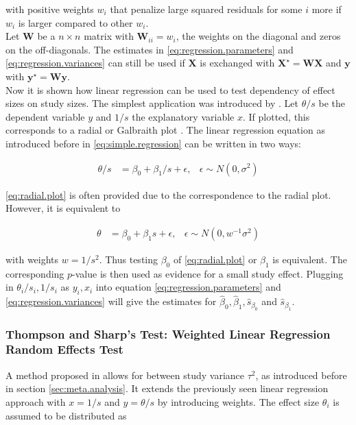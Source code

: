 with positive weights $w_i$ that penalize large squared residuals for some $i$ more if $w_i$ is larger compared to other $w_i$. \\
Let $\mathbf{W}$ be a $n \times n$ matrix with $\mathbf{W}_{ii} = w_i$, the weights on the diagonal and zeros on the off-diagonals. The estimates in \ref{eq:regression.parameters} and \ref{eq:regression.variances} can still be used if $\mathbf{X}$ is exchanged with $\mathbf{X}^\star =  \mathbf{W} \mathbf{X}$ and $\mathbf{y}$ with $\mathbf{y}^\star = \mathbf{W} \mathbf{y}$. \label{weighted.regression} \\
Now it is shown how linear regression can be used to test dependency of effect sizes on study sizes. The simplest application was introduced by \citet{Egger}.
Let $\theta/s$ be the dependent variable $y$ and $1/s$ the explanatory variable $x$. If plotted, this corresponds to a radial or Galbraith plot \citet{galbraith}. The linear regression equation as introduced before in \ref{eq:simple.regression} can be written in two ways:

\begin{align}
\theta/s &= \beta_0 + \beta_1/s + \epsilon, & \epsilon \sim N(0, \sigma^2) \label{eq:radial.plot} 
\end{align}

\ref{eq:radial.plot} is often provided due to the correspondence to the radial plot. However, it is equivalent to

\begin{align}
\theta &= \beta_0 + \beta_1 s + \epsilon, & \epsilon \sim N(0, w^{-1}\sigma^2) \label{eq:egger.plot}
\end{align}

with weights $w = 1/s^2$. Thus testing $\beta_0$ of \ref{eq:radial.plot} or $\beta_1$ is equivalent. The corresponding $p$-value is then used as evidence for a small study effect. Plugging in  $\theta_i/s_i, 1/s_i$ as $y_i, x_i$ into equation \ref{eq:regression.parameters} and \ref{eq:regression.variances} will give the estimates for $\hat{\beta}_0, \hat{\beta}_1,\hat{s}_{\beta_0}$ and $\hat{s}_{\beta_1}$.



\subsubsection{Thompson and Sharp's Test: Weighted Linear Regression Random Effects Test} \label{sec:Thompson}
A method proposed in \citet{thompson.sharp} allows for between study variance $\tau^2$, as introduced before in section \ref{sec:meta.analysis}. It extends the previously seen linear regression approach with $x = 1/s$ and $y = \theta/s$ by introducing weights. The effect size $\theta_i$ is assumed to be distributed as

